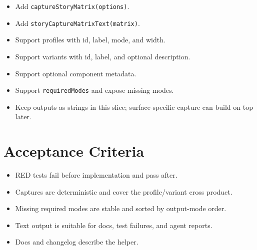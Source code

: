 \begin{itemize}
\tightlist
\item
  Add \texttt{c\allowbreak{}a\allowbreak{}p\allowbreak{}t\allowbreak{}u\allowbreak{}r\allowbreak{}e\allowbreak{}S\allowbreak{}t\allowbreak{}o\allowbreak{}r\allowbreak{}y\allowbreak{}M\allowbreak{}a\allowbreak{}t\allowbreak{}r\allowbreak{}i\allowbreak{}x\allowbreak{}(\allowbreak{}o\allowbreak{}p\allowbreak{}t\allowbreak{}i\allowbreak{}o\allowbreak{}n\allowbreak{}s\allowbreak{})}.
\item
  Add \texttt{s\allowbreak{}t\allowbreak{}o\allowbreak{}r\allowbreak{}y\allowbreak{}C\allowbreak{}a\allowbreak{}p\allowbreak{}t\allowbreak{}u\allowbreak{}r\allowbreak{}e\allowbreak{}M\allowbreak{}a\allowbreak{}t\allowbreak{}r\allowbreak{}i\allowbreak{}x\allowbreak{}T\allowbreak{}e\allowbreak{}x\allowbreak{}t\allowbreak{}(\allowbreak{}m\allowbreak{}a\allowbreak{}t\allowbreak{}r\allowbreak{}i\allowbreak{}x\allowbreak{})}.
\item
  Support profiles with id, label, mode, and width.
\item
  Support variants with id, label, and optional description.
\item
  Support optional component metadata.
\item
  Support \texttt{r\allowbreak{}e\allowbreak{}q\allowbreak{}u\allowbreak{}i\allowbreak{}r\allowbreak{}e\allowbreak{}d\allowbreak{}M\allowbreak{}o\allowbreak{}d\allowbreak{}e\allowbreak{}s} and expose missing modes.
\item
  Keep outputs as strings in this slice; surface-specific capture can build on top later.
\end{itemize}

\section{Acceptance Criteria}\label{record-089-acceptance-criteria}

\begin{itemize}
\tightlist
\item
  RED tests fail before implementation and pass after.
\item
  Captures are deterministic and cover the profile/variant cross product.
\item
  Missing required modes are stable and sorted by output-mode order.
\item
  Text output is suitable for docs, test failures, and agent reports.
\item
  Docs and changelog describe the helper.
\end{itemize}

